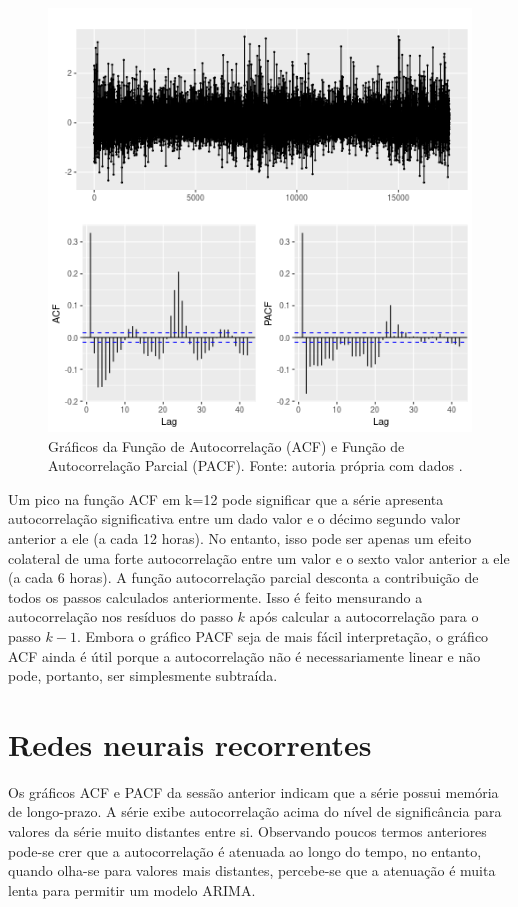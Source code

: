 \documentclass[
	12pt,				%
	openright,			%
	oneside,			%
	a4paper,			%
	english,			%
	french,				%
	spanish,			%
	brazil				%
	]{abntex2}
\begin{document}
\begin{figure}[h]
    \centering
	\includegraphics[width=\textwidth]{long_memory.png}
	\caption{Gráficos da Função de Autocorrelação (ACF) e Função de Autocorrelação Parcial (PACF). Fonte: autoria própria com dados \cite{era5}.}
\end{figure}
\FloatBarrier 

Um pico na função ACF em k=12 pode significar que a série apresenta autocorrelação significativa entre um dado valor e o décimo segundo valor anterior a ele (a cada 12 horas). No entanto, isso pode ser apenas um efeito colateral de uma forte autocorrelação entre um valor e o sexto valor anterior a ele (a cada 6 horas). A função autocorrelação parcial desconta a contribuição de todos os passos calculados anteriormente. Isso é feito mensurando a autocorrelação nos resíduos do passo $k$ após calcular a autocorrelação para o passo $k-1$. Embora o gráfico PACF seja de mais fácil interpretação, o gráfico ACF ainda é útil porque a autocorrelação não é necessariamente linear e não pode, portanto, ser simplesmente subtraída.

\section{Redes neurais recorrentes}

Os gráficos ACF e PACF da sessão anterior indicam que a série possui memória de longo-prazo. A série exibe autocorrelação acima do nível de significância para valores da série muito distantes entre si. Observando poucos termos anteriores pode-se crer que a autocorrelação é atenuada ao longo do tempo, no entanto, quando olha-se para valores mais distantes, percebe-se que a atenuação é muita lenta para permitir um modelo ARIMA.
\end{document}
